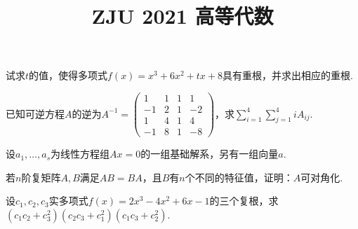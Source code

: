 \documentclass{BHCexam}
\begin{document}
	
	\title{ZJU 2021 高等代数}
	
	\maketitle
	
	\begin{groups}
        \begin{questions}
            \question 试求$t$的值，使得多项式$f(x)=x^3+6x^2+tx+8$具有重根，并求出相应的重根.
        \end{questions}

        \begin{questions}
            \question[15] 
            已知可逆方程$A$的逆为$A^{-1}=\begin{pmatrix}
                1 & 1 & 1 & 1\\
                -1 & 2 & 1 & -2 \\
                1 & 4 & 1 & 4 \\
                -1 & 8 & 1 & -8
            \end{pmatrix}$，求$\sum \limits_{i=1}^4 \sum \limits_{j=1}^4 i A_{ij}$.
        \end{questions}

        \begin{questions}
            \question[15] 
            设$a_1,\dots,a_s$为线性方程组$Ax=0$的一组基础解系，另有一组向量$a$.
        \end{questions}

        \begin{questions}
            \question[15]
            若$n$阶复矩阵$A,B$满足$AB=BA$，且$B$有$n$个不同的特征值，证明：$A$可对角化.
        \end{questions}

        \begin{questions}
            \question[15]
            设$c_1,c_2,c_3$实多项式$f(x)=2x^3-4x^2+6x-1$的三个复根，求$(c_1c_2+c_3^2)(
                c_2c_3+c_1^2
            )(c_1c_3+c_2^2)$.
        \end{questions}


\end{groups}
\end{document}
